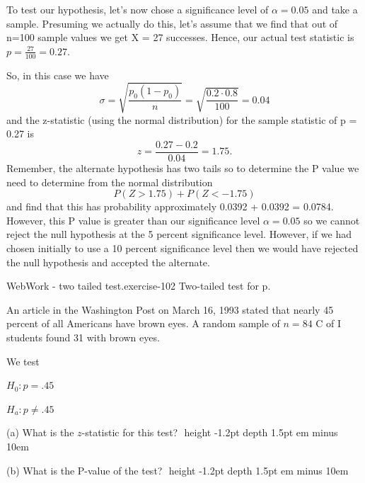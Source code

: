 \documentclass[10pt,]{book}
\newcommand{\fillin}[1]{\leavevmode\leaders\vrule height -1.2pt depth 1.5pt \hskip #1em minus #1em \null}
\numberwithin{equation}{section}
\newcommand{\lt}{<}
\newcommand{\gt}{>}
\begin{document}
\par
\hypertarget{p-1444}{}%
To test our hypothesis, let's now chose a significance level of \(\alpha = 0.05\) and take a sample. Presuming we actually do this, let's assume that we find that out of n=100 sample values we get X = 27 successes. Hence, our actual test statistic is \(p = \frac{27}{100} = 0.27\).%
\par
\hypertarget{p-1445}{}%
So, in this case we have%
\begin{equation*}
\sigma = \sqrt{\frac{p_0(1-p_0)}{n}} = \sqrt{\frac{0.2 \cdot 0.8}{100}} = 0.04
\end{equation*}
and the z-statistic (using the normal distribution) for the sample statistic of p = 0.27 is%
\begin{equation*}
z = \frac{0.27 - 0.2}{0.04} = 1.75.
\end{equation*}
Remember, the alternate hypothesis has two tails so to determine the P value we need to determine from the normal distribution%
\begin{equation*}
P(Z \gt 1.75) + P(Z \lt -1.75)
\end{equation*}
and find that this has probability approximately 0.0392 + 0.0392 = 0.0784.  However, this P value is greater than our significance level \(\alpha = 0.05\) so we cannot reject the null hypothesis at the 5 percent significance level. However, if we had chosen initially to use a 10 percent significance level then we would have rejected the null hypothesis and accepted the alternate.%
\par
\hypertarget{p-1446}{}%
\begin{inlineexercise}{WebWork - two tailed test.}{exercise-102}%
\hypertarget{p-1447}{}%
Two-tailed test for p.%
\par\medskip
\hypertarget{p-1448}{}%
An article in the Washington Post on March 16, 1993 stated that nearly 45 percent of  all Americans have brown eyes.  A random sample of \(n = 
84\) C of I students found 31 with brown eyes.%
\par
\hypertarget{p-1449}{}%
We test%
\par
\hypertarget{p-1450}{}%
\(H_0: p = .45\)%
\par
\hypertarget{p-1451}{}%
\(H_a: p \neq .45\)%
\par
\hypertarget{p-1452}{}%
(a) What is the \(z\)-statistic for this test? \(\)  \fillin{10}%
\par
\hypertarget{p-1453}{}%
(b) What is the P-value of the test?  \(\)  \fillin{10}%
\end{inlineexercise}
\end{document}
